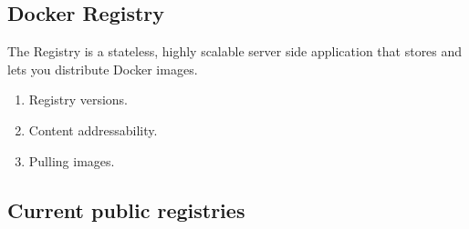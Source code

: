 \subsection{Docker Registry}

The Registry is a stateless, highly scalable server side application that stores and lets you distribute Docker images.

\begin{enumerate}
	\item Registry versions.
	\item Content addressability.
	\item Pulling images.
\end{enumerate}

\subsection{Current public registries}
